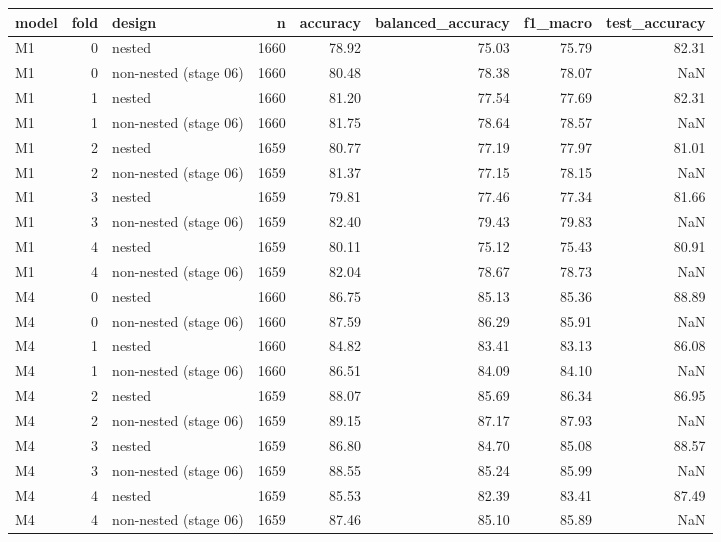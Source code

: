 \begin{tabular}{lrlrrrrr}
\toprule
model & fold & design & n & accuracy & balanced\_accuracy & f1\_macro & test\_accuracy \\
\midrule
M1 & 0 & nested & 1660 & 78.92 & 75.03 & 75.79 & 82.31 \\
M1 & 0 & non-nested (stage 06) & 1660 & 80.48 & 78.38 & 78.07 & NaN \\
M1 & 1 & nested & 1660 & 81.20 & 77.54 & 77.69 & 82.31 \\
M1 & 1 & non-nested (stage 06) & 1660 & 81.75 & 78.64 & 78.57 & NaN \\
M1 & 2 & nested & 1659 & 80.77 & 77.19 & 77.97 & 81.01 \\
M1 & 2 & non-nested (stage 06) & 1659 & 81.37 & 77.15 & 78.15 & NaN \\
M1 & 3 & nested & 1659 & 79.81 & 77.46 & 77.34 & 81.66 \\
M1 & 3 & non-nested (stage 06) & 1659 & 82.40 & 79.43 & 79.83 & NaN \\
M1 & 4 & nested & 1659 & 80.11 & 75.12 & 75.43 & 80.91 \\
M1 & 4 & non-nested (stage 06) & 1659 & 82.04 & 78.67 & 78.73 & NaN \\
M4 & 0 & nested & 1660 & 86.75 & 85.13 & 85.36 & 88.89 \\
M4 & 0 & non-nested (stage 06) & 1660 & 87.59 & 86.29 & 85.91 & NaN \\
M4 & 1 & nested & 1660 & 84.82 & 83.41 & 83.13 & 86.08 \\
M4 & 1 & non-nested (stage 06) & 1660 & 86.51 & 84.09 & 84.10 & NaN \\
M4 & 2 & nested & 1659 & 88.07 & 85.69 & 86.34 & 86.95 \\
M4 & 2 & non-nested (stage 06) & 1659 & 89.15 & 87.17 & 87.93 & NaN \\
M4 & 3 & nested & 1659 & 86.80 & 84.70 & 85.08 & 88.57 \\
M4 & 3 & non-nested (stage 06) & 1659 & 88.55 & 85.24 & 85.99 & NaN \\
M4 & 4 & nested & 1659 & 85.53 & 82.39 & 83.41 & 87.49 \\
M4 & 4 & non-nested (stage 06) & 1659 & 87.46 & 85.10 & 85.89 & NaN \\
\bottomrule
\end{tabular}
